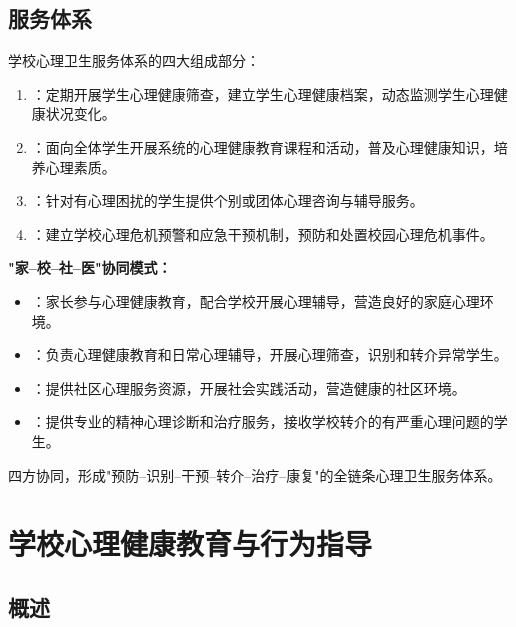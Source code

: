 \subsection{服务体系}

\begin{keybox}
学校心理卫生服务体系的四大组成部分：

\begin{enumerate}[leftmargin=*]
    \item {}：定期开展学生心理健康筛查，建立学生心理健康档案，动态监测学生心理健康状况变化。
    \item {}：面向全体学生开展系统的心理健康教育课程和活动，普及心理健康知识，培养心理素质。
    \item {}：针对有心理困扰的学生提供个别或团体心理咨询与辅导服务。
    \item {}：建立学校心理危机预警和应急干预机制，预防和处置校园心理危机事件。
\end{enumerate}

\textbf{"家--校--社--医"协同模式：}

\begin{itemize}[leftmargin=*]
    \item {}：家长参与心理健康教育，配合学校开展心理辅导，营造良好的家庭心理环境。
    \item {}：负责心理健康教育和日常心理辅导，开展心理筛查，识别和转介异常学生。
    \item {}：提供社区心理服务资源，开展社会实践活动，营造健康的社区环境。
    \item {}：提供专业的精神心理诊断和治疗服务，接收学校转介的有严重心理问题的学生。
\end{itemize}

四方协同，形成"预防--识别--干预--转介--治疗--康复"的全链条心理卫生服务体系。
\end{keybox}

\section{学校心理健康教育与行为指导}

\subsection{概述}

